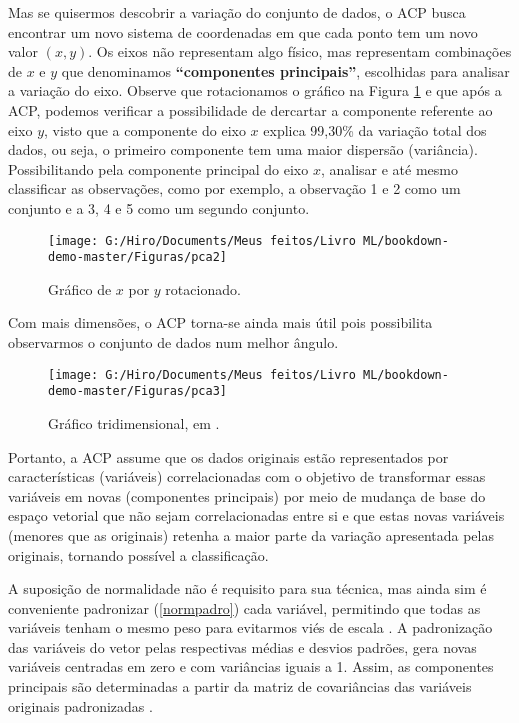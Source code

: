 \documentclass[
]{book}
\begin{document}
Mas se quisermos descobrir a variação do conjunto de dados, o ACP busca encontrar um novo sistema de coordenadas em que cada ponto tem um novo valor \((x, y)\). Os eixos não representam algo físico, mas representam combinações de \(x\) e \(y\) que denominamos \textbf{``componentes principais''}, escolhidas para analisar a variação do eixo. Observe que rotacionamos o gráfico na Figura \ref{fig:pca2} e que após a ACP, podemos verificar a possibilidade de dercartar a componente referente ao eixo \(y\), visto que a componente do eixo \(x\) explica 99,30\% da variação total dos dados, ou seja, o primeiro componente tem uma maior dispersão (variância). Possibilitando pela componente principal do eixo \(x\), analisar e até mesmo classificar as observações, como por exemplo, a observação 1 e 2 como um conjunto e a 3, 4 e 5 como um segundo conjunto.

\begin{figure}

{\centering \texttt{[image: G:/Hiro/Documents/Meus feitos/Livro ML/bookdown-demo-master/Figuras/pca2]} 

}

\caption{Gráfico de \(x\) por \(y\) rotacionado.}\label{fig:pca2}
\end{figure}



Com mais dimensões, o ACP torna-se ainda mais útil pois possibilita observarmos o conjunto de dados num melhor ângulo.

\begin{figure}

{\centering \texttt{[image: G:/Hiro/Documents/Meus feitos/Livro ML/bookdown-demo-master/Figuras/pca3]} 

}

\caption{Gráfico tridimensional, em \citet{powellpca}.}\label{fig:pca3}
\end{figure}



Portanto, a ACP assume que os dados originais estão representados por características (variáveis) correlacionadas com o objetivo de transformar essas variáveis em novas (componentes principais) por meio de mudança de base do espaço vetorial que não sejam correlacionadas entre si e que estas novas variáveis (menores que as originais) retenha a maior parte da variação apresentada pelas originais, tornando possível a classificação.

A suposição de normalidade não é requisito para sua técnica, mas ainda sim é conveniente padronizar (\ref{normpadro}) cada variável, permitindo que todas as variáveis tenham o mesmo peso para evitarmos viés de escala \citep{hongyu2016analise}. A padronização das variáveis do vetor pelas respectivas médias e desvios padrões, gera novas variáveis centradas em zero e com variâncias iguais a 1. Assim, as componentes principais são determinadas a partir da matriz de covariâncias das variáveis originais padronizadas \citep{mingoti2007analise}.
\end{document}
